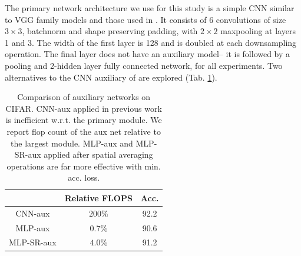 \documentclass{article}
\begin{document}
The primary network architecture we use for this study is a simple CNN similar to VGG family models \citep{simonyan2014very} and those used in \citep{shallow}. It consists of 6 convolutions of size $3\times 3$, batchnorm and shape preserving padding, with $2\times2$ maxpooling at layers 1 and 3. The  width of the first layer is 128 and is doubled at each downsampling operation. The final layer does not have an auxiliary model-- it is followed by a pooling and 2-hidden layer fully connected network, for all experiments.  Two alternatives to the CNN auxiliary of \citep{shallow} are explored (Tab. \ref{tab:flop}).%
    \begin{table}
    \centering
    \begin{tabular}{|c|c|c|}
    \hline&Relative FLOPS&Acc.\\\hline
     CNN-aux&   $200\%$ &92.2\\\hline
    MLP-aux&     $0.7\%$ &90.6\\\hline
     MLP-SR-aux& $4.0\%$  &91.2\\\hline


    \end{tabular}
    \caption{Comparison of auxiliary networks on CIFAR. CNN-aux applied in previous work is inefficient w.r.t. the primary module. We report flop count of the aux net relative to the largest module. MLP-aux and MLP-SR-aux applied after spatial averaging operations are far more effective with min. acc. loss. }
    \label{tab:flop}
    \end{table}
\end{document}
